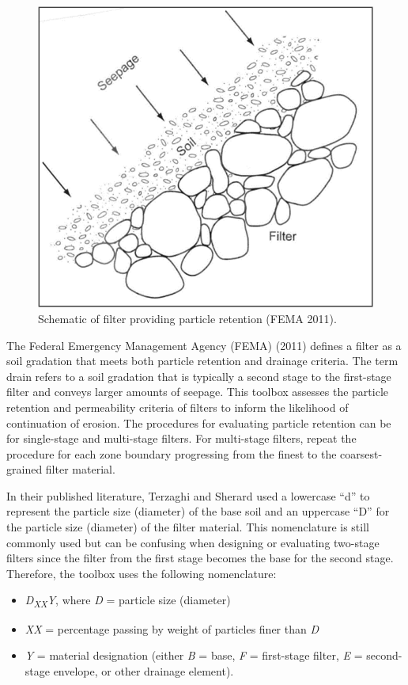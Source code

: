 \documentclass[
]{book}
\begin{document}
\begin{figure}

{\centering \includegraphics{images/figure8} 

}

\caption{Schematic of filter providing particle retention (FEMA 2011).}\label{fig:figure-8}
\end{figure}

The Federal Emergency Management Agency (FEMA) (2011) defines a filter as a soil gradation that meets both particle retention and drainage criteria. The term drain refers to a soil gradation that is typically a second stage to the first-stage filter and conveys larger amounts of seepage. This toolbox assesses the particle retention and permeability criteria of filters to inform the likelihood of continuation of erosion. The procedures for evaluating particle retention can be for single-stage and multi-stage filters. For multi-stage filters, repeat the procedure for each zone boundary progressing from the finest to the coarsest-grained filter material.

In their published literature, Terzaghi and Sherard used a lowercase ``d'' to represent the particle size (diameter) of the base soil and an uppercase ``D'' for the particle size (diameter) of the filter material. This nomenclature is still commonly used but can be confusing when designing or evaluating two-stage filters since the filter from the first stage becomes the base for the second stage. Therefore, the toolbox uses the following nomenclature:

\begin{itemize}
\item
  \emph{D\textsubscript{XX}Y}, where \emph{D} = particle size (diameter)
\item
  \emph{XX} = percentage passing by weight of particles finer than \emph{D}
\item
  \emph{Y} = material designation (either \emph{B} = base, \emph{F} = first-stage filter, \emph{E} = second-stage envelope, or other drainage element).
\end{itemize}

  
\end{document}

